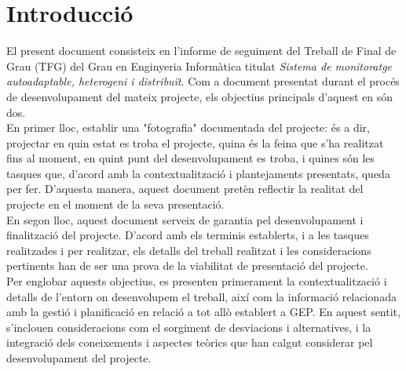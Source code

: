 
\chapter{Introducció} %

\label{Introduccio} %

El present document consisteix en l'informe de seguiment del Treball de Final de Grau (TFG) del Grau en Enginyeria Informàtica titulat \textit{Sistema de monitoratge autoadaptable, heterogeni i distribuït}. Com a document presentat durant el procés de desenvolupament del mateix projecte, els objectius principals d'aquest en són dos.\\

En primer lloc, establir una "fotografia" documentada del projecte: és a dir, projectar en quin estat es troba el projecte, quina és la feina que s'ha realitzat fins al moment, en quint punt del desenvolupament es troba, i quines són les tasques que, d'acord amb la contextualització i plantejaments presentats, queda per fer. D'aquesta manera, aquest document pretèn reflectir la realitat del projecte en el moment de la seva presentació.\\

En segon lloc, aquest document serveix de garantia pel desenvolupament i finalització del projecte. D'acord amb els terminis establerts, i a les tasques realitzades i per realitzar, els detalls del treball realitzat i les consideracions pertinents han de ser una prova de la viabilitat de presentació del projecte.\\

Per englobar aquests objectius, es presenten primerament la contextualització i detalls de l'entorn on desenvolupem el treball, així com la informació relacionada amb la gestió i planificació en relació a tot allò establert a GEP. En aquest sentit, s'inclouen consideracions com el sorgiment de desviacions i alternatives, i la integració dels coneixements i aspectes teòrics que han calgut considerar pel desenvolupament del projecte.